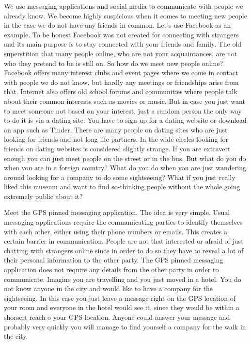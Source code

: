 \documentclass[thesis=M,english]{FITthesis}[2012/10/20]
\begin{document}
We use messaging applications and social media to communicate with people we already know. We become highly suspicious when it comes to meeting new people in the case we do not have any friends in common. Let's use Facebook as an example. To be honest Facebook was not created for connecting with strangers and its main purpose is to stay connected with your friends and family. The old superstition that many people online, who are not your acquaintances, are not who they pretend to be is still on. So how do we meet new people online? Facebook offers many interest clubs and event pages where we come in contact with people we do not know, but hardly any meetings or friendships arise from that. Internet also offers old school forums and communities where people talk about their common interests such as movies or music. But in case you just want to meet someone not based on your interest, just a random person the only way to do it is via a dating site. You have to sign up for a dating website or download an app such as Tinder. There are many people on dating sites who are just looking for friends and not long life partners. In the wide circles looking for friends on dating websites is considered slightly strange. If you are extravert enough you can just meet people on the street or in the bus. But what do you do when you are in a foreign country? What do you do when you are just wandering around looking for a company to do some sightseeing? What if you just really liked this museum and want to find so-thinking people without the whole going extremely public about it?

Meet the GPS pinned messaging application. The idea is very simple. Usual messaging applications require the communicating parties to identify themselves with each other, either using their phone numbers or emails. This creates a certain barrier in communication. People are not that interested or afraid of just chatting with strangers online since in order to do so they have to reveal a lot of their personal information to the other party. The GPS pinned messaging application does not require any details from the other party in order to communicate. Imagine you are travelling and you just moved in a hotel. You do not know anyone in the city and would like to have a company for the sightseeing. In this case you just leave a message right on the GPS location of your room and everyone in the hotel would see it, since they would be within a shorsert reach o your GPS location. Anyone could answer your message and probably very quickly you will manage to find yourself a company for the walk in the city.
\end{document}
